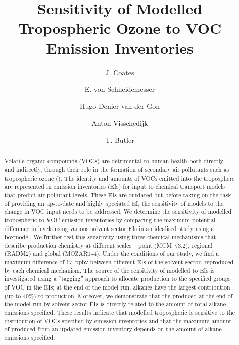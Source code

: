 \documentclass[14pt]{extarticle}
\title{Sensitivity of Modelled Tropospheric Ozone to VOC Emission Inventories}
\author[1]{J. Coates}
\author[1]{E. von Schneidemesser}
\author[2]{Hugo Denier van der Gon}
\author[2]{Anton Visschedijk}
\author[1]{T. Butler}
\affil[1]{Institute for Advanced Sustainability Studies, Potsdam, Germany}
\affil[2]{TNO Built Environment and Geosciences, Utrecht, The Netherlands}
\begin{document}
\maketitle

\begin{abstract}
    Volatile organic compounds (VOCs) are detrimental to human health both directly and indirectly, through their role in the formation of secondary air pollutants such as tropospheric ozone ().
    The identity and amounts of VOCs emitted into the troposphere are represented in emission inventories (EIs) for input to chemical transport models that predict air pollutant levels.
    These EIs are outdated but before taking on the task of providing an up-to-date and highly speciated EI, the sensitivity of models to the change in VOC input needs to be addressed.
    We determine the sensitivity of modelled tropospheric  to VOC emission inventories by comparing the maximum potential difference in  levels using various solvent sector EIs in an idealised study using a boxmodel.
    We further test this sensitivity using three chemical mechanisms that describe  production chemistry at different scales -- point (MCM~v3.2), regional (RADM2) and global (MOZART-4).
    Under the conditions of our study, we find a maximum difference of 17~ppbv between different EIs of the solvent sector, reproduced by each chemical mechanism. 
    The source of the sensitivity of modelled  to EIs is investigated using a ``tagging'' approach to allocate  production to the specified groups of VOC in the EIs; at the end of the model run, alkanes have the largest contribution (up to $40$\%) to  production.
    Moreover, we demonstrate that the  produced at the end of the model run by solvent sector EIs is directly related to the amount of total alkane emissions specified.
    These results indicate that modelled tropospheric  is sensitive to the distribution of VOCs specified by emission inventories and that the maximum amount of  produced from an updated emission inventory depends on the amount of alkane emissions specified.
\end{abstract}
\end{document}
